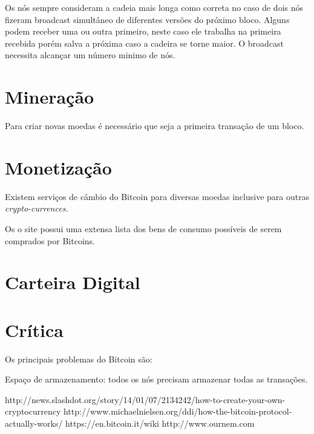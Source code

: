 \documentclass[a4paper,11pt]{article}
\theoremstyle{mytheor}
\begin{document}
Os nós sempre consideram a cadeia mais longa como correta no caso de dois nós fizeram broadcast simultâneo de diferentes versões do próximo bloco. Alguns podem receber uma ou outra primeiro, neste caso ele trabalha na primeira recebida porém salva a próxima caso a cadeira se torne maior. O broadcast necessita alcançar um número minimo de nós.

\section*{Mineração}
Para criar novas moedas é necessário que seja a primeira transação de um bloco.
\section*{Monetização}

Existem serviços de câmbio do Bitcoin para diversas moedas inclusive para outras \textit{crypto-currences}.

Os o site \cite{trade} possui uma extensa lista dos bens de consumo possíveis de serem comprados por Bitcoins.

\section*{Carteira Digital}

\section*{Crítica}

Os principais problemas do Bitcoin são:

Espaço de armazenamento: todos os nós precisam armazenar todas as transações.


{}
http://news.slashdot.org/story/14/01/07/2134242/how-to-create-your-own-cryptocurrency
http://www.michaelnielsen.org/ddi/how-the-bitcoin-protocol-actually-works/
https://en.bitcoin.it/wiki
http://www.ournem.com


\end{document}
